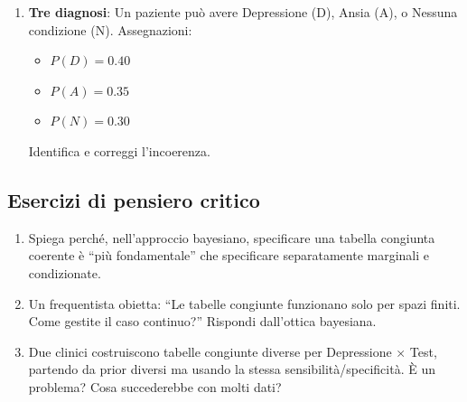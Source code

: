 \documentclass[
  letterpaper,
  DIV=11,
  numbers=noendperiod,
  oneside]{scrreprt}
\providecommand{\tightlist}{%
  \setlength{\itemsep}{0pt}\setlength{\parskip}{0pt}}
\theoremstyle{definition}
\theoremstyle{plain}
\theoremstyle{definition}
\theoremstyle{remark}
\begin{document}
\begin{tcolorbox}
\begin{enumerate}
  \begin{itemize}
  \tightlist
  \item
    Sensibilità: 0.80
  \item
    Specificità: 0.85
  \item
    Prevalenza nell'ambulatorio: 0.25
  \end{itemize}

  \begin{enumerate}
  \def\labelenumii{\alph{enumii}.}
  \tightlist
  \item
    Costruisci la tabella 2×2 per (Ansia × Test)
  \item
    Un paziente ha test positivo. Quanto è probabile che sia ansioso?
  \item
    Se il test è negativo, quanto è probabile l'assenza di ansia?
  \end{enumerate}
\item
  \textbf{Tre diagnosi}: Un paziente può avere Depressione (D), Ansia
  (A), o Nessuna condizione (N). Assegnazioni:

  \begin{itemize}
  \tightlist
  \item
    \(P(D) = 0.40\)
  \item
    \(P(A) = 0.35\)
  \item
    \(P(N) = 0.30\)
  \end{itemize}

  Identifica e correggi l'incoerenza.
\end{enumerate}

\subsection{Esercizi di pensiero
critico}\label{esercizi-di-pensiero-critico}

\begin{enumerate}
\def\labelenumi{\arabic{enumi}.}
\setcounter{enumi}{12}
\item
  Spiega perché, nell'approccio bayesiano, specificare una tabella
  congiunta coerente è ``più fondamentale'' che specificare
  separatamente marginali e condizionate.
\item
  Un frequentista obietta: ``Le tabelle congiunte funzionano solo per
  spazi finiti. Come gestite il caso continuo?'' Rispondi dall'ottica
  bayesiana.
\item
  Due clinici costruiscono tabelle congiunte diverse per Depressione ×
  Test, partendo da prior diversi ma usando la stessa
  sensibilità/specificità. È un problema? Cosa succederebbe con molti
  dati?
\end{enumerate}


\end{tcolorbox}
\end{document}
